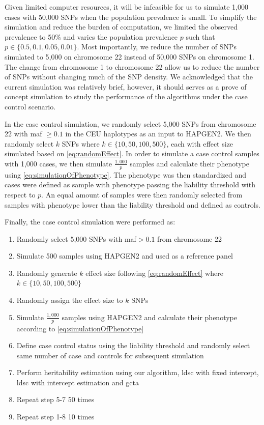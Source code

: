 		Given limited computer resources, it will be infeasible for us to simulate 1,000 cases with 50,000 \glspl{SNP} when the population prevalence is small.
		To simplify the simulation and reduce the burden of computation, we limited the observed prevalence to 50\% and varies the population prevalence $p$ such that $p\in\{0.5, 0.1, 0.05, 0.01\}$.
		Most importantly, we reduce the number of \glspl{SNP} simulated to 5,000 on chromosome 22 instead of 50,000 \glspl{SNP} on chromosome 1. 
		The change from chromosome 1 to chromosome 22 allow us to reduce the number of \glspl{SNP} without changing much of the \gls{SNP} density. 
		We acknowledged that the current simulation was relatively brief, however, it should serves as a prove of concept simulation to study the performance of the algorithms under the case control scenario.
		
		In the case control simulation, we randomly select 5,000 \glspl{SNP} from chromosome 22 with \gls{maf} $\ge0.1$ in the \gls{CEU} haplotypes as an input to HAPGEN2. 
		We then randomly select $k$ \glspl{SNP} where $k\in\{10,50,100,500\}$, each with effect size simulated based on \cref{eq:randomEffect}.
		In order to simulate a case control samples with 1,000 cases, we then simulate $\frac{1,000}{p}$ samples and calculate their phenotype using \cref{eq:simulationOfPhenotype}.
		The phenotype was then standardized and cases were defined as sample with phenotype passing the liability threshold with respect to $p$.
		An equal amount of samples were then randomly selected from samples with phenotype lower than the liability threshold and defined as controls.
			
		Finally, the case control simulation were performed as:
		\begin{enumerate}
			\item Randomly select 5,000 \glspl{SNP} with \gls{maf}$>0.1$ from chromosome 22
			\item Simulate 500 samples using HAPGEN2 and used as a reference panel
			\item Randomly generate $k$ effect size following \cref{eq:randomEffect} where $k\in\{10,50,100,500\}$
			\item Randomly assign the effect size to $k$ \glspl{SNP}
			\item Simulate $\frac{1,000}{p}$ samples using HAPGEN2 and calculate their phenotype according to \cref{eq:simulationOfPhenotype}
			\item Define case control status using the liability threshold and randomly select same number of case and controls for subsequent simulation
			\item Perform heritability estimation using our algorithm, \gls{ldsc} with fixed intercept, \gls{ldsc} with intercept estimation and \gls{gcta}
			\item Repeat step 5-7 50 times
			\item Repeat step 1-8 10 times
		\end{enumerate}
		

